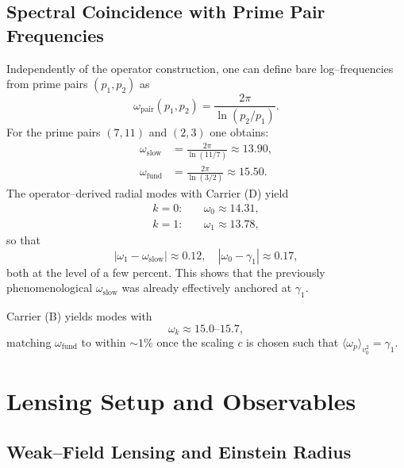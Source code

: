 \documentclass[11pt]{article}
\begin{document}
\subsection{Spectral Coincidence with Prime Pair Frequencies}

Independently of the operator construction, one can define bare log--frequencies from prime pairs $(p_1,p_2)$ as
\begin{equation}
  \omega_{\text{pair}}(p_1,p_2) = \frac{2\pi}{\ln(p_2/p_1)}.
\end{equation}
For the prime pairs $(7,11)$ and $(2,3)$ one obtains:
\begin{align}
  \omega_{\text{slow}} &= \frac{2\pi}{\ln(11/7)} \approx 13.90,\\
  \omega_{\text{fund}} &= \frac{2\pi}{\ln(3/2)} \approx 15.50.
\end{align}
The operator--derived radial modes with Carrier (D) yield
\begin{align}
  k=0:&\quad \omega_0 \approx 14.31,\\
  k=1:&\quad \omega_1 \approx 13.78,
\end{align}
so that
\[
|\omega_1 - \omega_{\text{slow}}| \approx 0.12,\quad
|\omega_0 - \gamma_1| \approx 0.17,
\]
both at the level of a few percent. This shows that the previously phenomenological $\omega_{\text{slow}}$ was already effectively anchored at $\gamma_1$.

Carrier (B) yields modes with
\[
\omega_k \approx 15.0 \text{--} 15.7,
\]
matching $\omega_{\text{fund}}$ to within $\sim 1\%$ once the scaling $c$ is chosen such that $\langle \omega_p \rangle_{v_0^2} = \gamma_1$.

\section{Lensing Setup and Observables}

\subsection{Weak--Field Lensing and Einstein Radius}
\end{document}
